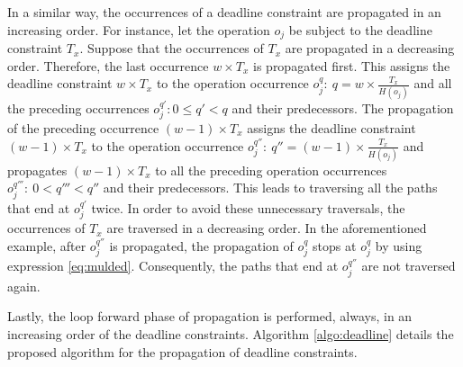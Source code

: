 In a similar way, the occurrences of a deadline constraint are propagated in an increasing order. For instance, let the operation $o_j$ be subject to the deadline constraint $T_x$. Suppose that the occurrences of $T_x$ are propagated in a decreasing order. Therefore, the last occurrence $w \times T_x$ is propagated first. This assigns the deadline constraint $w \times T_x$ to the operation occurrence $o_j^q:\ q = w \times \frac{T_x}{H(o_j)}$ and all the preceding occurrences $o_j^{q'}: 0 \leq q' < q $ and their predecessors. The propagation of the preceding occurrence $(w-1) \times T_x$ assigns the deadline constraint $(w-1) \times T_x$ to the operation occurrence $o_j^{q''}:\ q'' = (w-1) \times \frac{T_x}{H(o_j)}$ and propagates $(w-1) \times T_x$ to all the preceding operation occurrences $o_j^{q'''}:\ 0 < q''' < q'' $ and their predecessors. This leads to traversing all the paths that end at $o_j^{q'}$ twice. In order to avoid these unnecessary traversals, the occurrences of $T_x$ are traversed in a decreasing order. In the aforementioned example, after $o_j^{q''}$ is propagated, the propagation of $o_j^{q}$ stops at $o_j^q$ by using expression \ref{eq:mulded}. Consequently, the paths that end at $o_j^{q''}$ are not traversed again.

Lastly, the loop forward phase of propagation is performed, always, in an increasing order of the deadline constraints. Algorithm \ref{algo:deadline} details the proposed algorithm for the propagation of deadline constraints.

